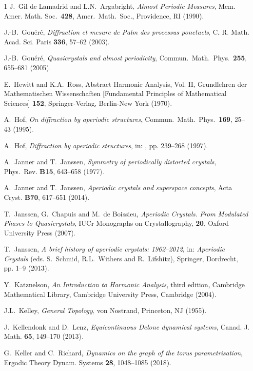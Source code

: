 \documentclass[11pt, a4wide]{amsart}
\numberwithin{lemma}{section}
\begin{document}
\begin{thebibliography}{1}
{J.~Gil de Lamadrid and L.N.~Argabright,
\textit{Almost Periodic Measures},
 Mem. Amer. Math. Soc.~\textbf{428}, Amer.~Math.~Soc., Providence, RI (1990).}

{J.-B.~Gou\'{e}r\'{e},
\textit{Diffraction et mesure de Palm des processus ponctuels},
 C. R. Math. Acad. Sci. Paris \textbf{336}, 57--62 (2003).}


{J.-B.~Gou\'{e}r\'{e},
\textit{Quasicrystals and almost periodicity},
Commun.\ Math.\ Phys.\ \textbf{255}, 655--681 (2005).}

{E.~Hewitt and  K.A.~Ross,
Abstract Harmonic Analysis, Vol. II, Grundlehren der Mathematischen
Wissenschaften [Fundamental Principles of Mathematical Sciences] \textbf{152},
Springer-Verlag, Berlin-New York (1970).}

{A.~Hof,
\textit{On diffraction by aperiodic structures},
Commun.\ Math.\ Phys.\ \textbf{169}, 25--43 (1995).}

{A.~Hof,
\textit{Diffraction by aperiodic structures},
in: \cite{Moo}, pp. 239--268 (1997).}

{A.~Janner and T.~Janssen,
\textit{Symmetry of periodically distorted crystals},
Phys.~Rev. \textbf{B15}, 643--658 (1977).}


{A.~Janner and T.~Janssen,
\textit{Aperiodic crystals and superspace concepts},
Acta Cryst. \textbf{B70}, 617--651 (2014).}

{T.~Janssen, G.~Chapuis and M.~de Boissieu,
\textit{Aperiodic Crystals. From Modulated Phases to Quasicrystals},
IUCr Monographs on Crystallography, \textbf{20}, Oxford
University Press (2007).}

{T.~Janssen,
\textit{A brief history of aperiodic crystals: 1962--2012},
in:  \textit{Aperiodic Crystals} (eds. S.~Schmid, R.L.~Withers and R.~Lifshitz), Springer, Dordrecht, pp. 1--9 (2013).}

{Y.~Katznelson, \textit{An Introduction to Harmonic Analysis}, third edition, Cambridge Mathematical Library, Cambridge University Press, Cambridge (2004).}

{J.L.~Kelley,
\textit{General Topology},
von Nostrand, Princeton, NJ (1955).}

{J.~Kellendonk and D.~Lenz,
\textit{Equicontinuous Delone dynamical systems},
Canad. J. Math. \textbf{65}, 149--170 (2013).}

{G.~Keller and C.~Richard, \textit{Dynamics on the graph of the torus parametrisation},  Ergodic Theory Dynam. Systems  \textbf{28}, 1048--1085 (2018).}


\end{thebibliography}
\end{document}
